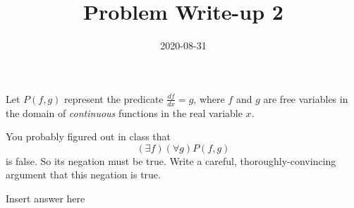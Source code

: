 \documentclass[12pt,a4paper]{article}
\title{Problem Write-up 2}
\date{2020-08-31}
\begin{document}
    \begin{problem}
        Let \(P(f,g)\) represent the predicate \(\frac{df}{dx} = g\text{,}\) where \(f\) and \(g\) are free variables in the domain of \emph{continuous} functions in the real variable \(x\).

        You probably figured out in class that 
        \begin{equation} \label{eq:1}
        	(\exists f)(\forall g) P(f,g)
        \end{equation}
         is false. So its negation must be true. Write a careful, thoroughly-convincing argument that this negation is true.
    \end{problem}
    
    \begin{answer}
        Insert answer here
    \end{answer}
\end{document}
